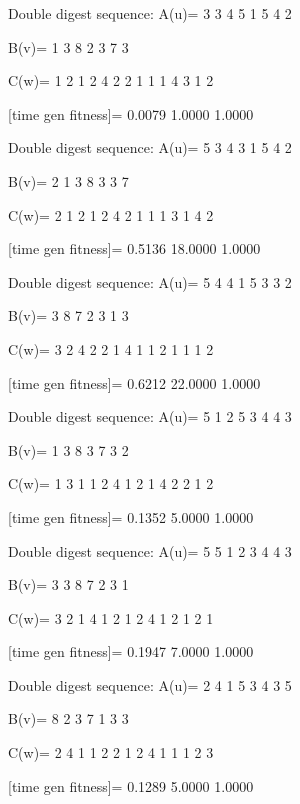 Double digest sequence:
A(u)=
     3     3     4     5     1     5     4     2

B(v)=
     1     3     8     2     3     7     3

C(w)=
     1     2     1     2     4     2     2     1     1     1     4     3     1     2

[time gen fitness]=
    0.0079    1.0000    1.0000

Double digest sequence:
A(u)=
     5     3     4     3     1     5     4     2

B(v)=
     2     1     3     8     3     3     7

C(w)=
     2     1     2     1     2     4     2     1     1     1     3     1     4     2

[time gen fitness]=
    0.5136   18.0000    1.0000

Double digest sequence:
A(u)=
     5     4     4     1     5     3     3     2

B(v)=
     3     8     7     2     3     1     3

C(w)=
     3     2     4     2     2     1     4     1     1     2     1     1     1     2

[time gen fitness]=
    0.6212   22.0000    1.0000

Double digest sequence:
A(u)=
     5     1     2     5     3     4     4     3

B(v)=
     1     3     8     3     7     3     2

C(w)=
     1     3     1     1     2     4     1     2     1     4     2     2     1     2

[time gen fitness]=
    0.1352    5.0000    1.0000

Double digest sequence:
A(u)=
     5     5     1     2     3     4     4     3

B(v)=
     3     3     8     7     2     3     1

C(w)=
     3     2     1     4     1     2     1     2     4     1     2     1     2     1

[time gen fitness]=
    0.1947    7.0000    1.0000

Double digest sequence:
A(u)=
     2     4     1     5     3     4     3     5

B(v)=
     8     2     3     7     1     3     3

C(w)=
     2     4     1     1     2     2     1     2     4     1     1     1     2     3

[time gen fitness]=
    0.1289    5.0000    1.0000

